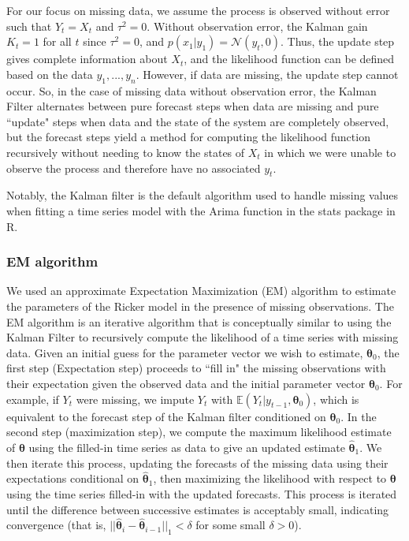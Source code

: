 \documentclass{article}
\begin{document}
For our focus on missing data, we assume the process is observed without error such that $Y_t = X_t$ and $\tau^2 = 0$. Without observation error, the Kalman gain $K_t = 1$ for all $t$ since $\tau^2 = 0$, and $p(x_1 | y_1) = \mathcal{N}(y_t, 0)$. Thus, the update step gives complete information about $X_t$, and the likelihood function can be defined based on the data $y_1,...,y_n$. However, if data are missing, the update step cannot occur. So, in the case of missing data without observation error, the Kalman Filter alternates between pure forecast steps when data are missing and pure ``update" steps when data and the state of the system are completely observed, but the forecast steps yield a method for computing the likelihood function recursively without needing to know the states of $X_t$ in which we were unable to observe the process and therefore have no associated $y_t$.

Notably, the Kalman filter is the default algorithm used to handle missing values when fitting a time series model with the Arima function in the stats package in R. 

\subsubsection*{EM algorithm}

We used an approximate Expectation Maximization (EM) algorithm to estimate the parameters of the Ricker model in the presence of missing observations. The EM algorithm is an iterative algorithm that is conceptually similar to using the Kalman Filter to recursively compute the likelihood of a time series with missing data. Given an initial guess for the parameter vector we wish to estimate, ${\bm \theta}_0$, the first step (Expectation step) proceeds to ``fill in" the missing observations with their expectation given the observed data and the initial parameter vector ${\bm \theta}_0$. For example, if $Y_t$ were missing, we impute $Y_t$ with $\mathbb{E}(Y_t | y_{t-1}, {\bm \theta}_0)$, which is equivalent to the forecast step of the Kalman filter conditioned on ${\bm \theta}_0$. In the second step (maximization step), we compute the maximum likelihood estimate of ${\bm \theta}$ using the filled-in time series as data to give an updated estimate $\hat {\bm \theta}_1$. We then iterate this process, updating the forecasts of the missing data using their expectations conditional on $\hat {\bm \theta}_1$, then maximizing the likelihood with respect to $\bm \theta$ using the time series filled-in with the updated forecasts. This process is iterated until the difference between successive estimates is acceptably small, indicating convergence (that is, $||\hat {\bm \theta}_i - \hat {\bm \theta}_{i-1}||_1 < \delta$ for some small $\delta > 0$).
\end{document}
